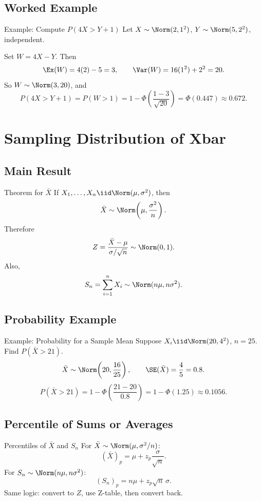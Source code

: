 \documentclass[aspectratio=169]{beamer}
\begin{document}
\subsection{Worked Example}
\begin{frame}{Example: Compute \(P(4X>Y+1)\)}
  Let \(X\sim\Norm(2,1^2)\), \(Y\sim\Norm(5,2^2)\), independent.

  Set \(W=4X-Y\). Then
  \[
    \Ex(W)=4(2)-5=3,
    \qquad
    \Var(W)=16(1^2)+2^2=20.
  \]
  So \(W\sim\Norm(3,20)\), and
  \[
    P(4X>Y+1)=P(W>1)
    =1-\Phi\!\left(\frac{1-3}{\sqrt{20}}\right)
    =\Phi(0.447)\approx0.672.
  \]
\end{frame}

\section{Sampling Distribution of Xbar}

\subsection{Main Result}
\begin{frame}{Theorem for \(\bar X\)}
  If \(X_1,\dots,X_n\iid\Norm(\mu,\sigma^2)\), then
  \[
    \bar X\sim\Norm\!\left(\mu,\frac{\sigma^2}{n}\right).
  \]
  Therefore
  \[
    Z=\frac{\bar X-\mu}{\sigma/\sqrt{n}}\sim\Norm(0,1).
  \]
  Also,
  \[
    S_n=\sum_{i=1}^n X_i\sim\Norm(n\mu,n\sigma^2).
  \]
\end{frame}

\subsection{Probability Example}
\begin{frame}{Example: Probability for a Sample Mean}
  Suppose \(X_i\iid\Norm(20,4^2)\), \(n=25\). Find \(P(\bar X>21)\).
  \[
    \bar X\sim\Norm\!\left(20,\frac{16}{25}\right),
    \qquad
    \SE(\bar X)=\frac{4}{5}=0.8.
  \]
  \[
    P(\bar X>21)=1-\Phi\!\left(\frac{21-20}{0.8}\right)
    =1-\Phi(1.25)
    \approx0.1056.
  \]
\end{frame}

\subsection{Percentile of Sums or Averages}
\begin{frame}{Percentiles of \(\bar X\) and \(S_n\)}
  For \(\bar X\sim\Norm(\mu,\sigma^2/n)\):
  \[
    (\bar X)_p=\mu+z_p\frac{\sigma}{\sqrt{n}}.
  \]
  For \(S_n\sim\Norm(n\mu,n\sigma^2)\):
  \[
    (S_n)_p=n\mu+z_p\sqrt{n}\,\sigma.
  \]
  Same logic: convert to \(Z\), use Z-table, then convert back.
\end{frame}
\end{document}
